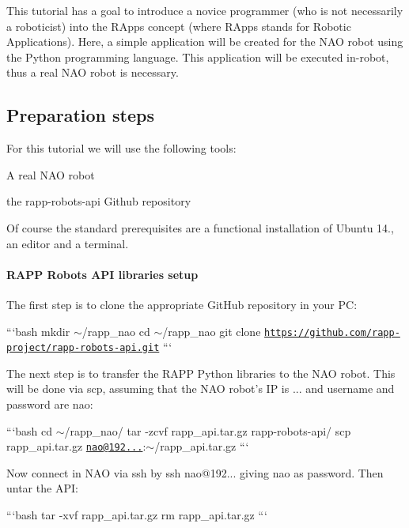 This tutorial has a goal to introduce a novice programmer (who is not necessarily a roboticist) into the R\-Apps concept (where R\-Apps stands for Robotic Applications). Here, a simple application will be created for the N\-A\-O robot using the Python programming language. This application will be executed in-\/robot, thus a real N\-A\-O robot is necessary.

\subsection*{Preparation steps}

For this tutorial we will use the following tools\-:
\begin{DoxyItemize}
\item A real N\-A\-O robot
\item the {\ttfamily rapp-\/robots-\/api} Github repository
\end{DoxyItemize}

Of course the standard prerequisites are a functional installation of Ubuntu 14., an editor and a terminal.

\paragraph*{R\-A\-P\-P Robots A\-P\-I libraries setup}

The first step is to clone the appropriate Git\-Hub repository in your P\-C\-:

```bash mkdir $\sim$/rapp\-\_\-nao cd $\sim$/rapp\-\_\-nao git clone \href{https://github.com/rapp-project/rapp-robots-api.git}{\tt https\-://github.\-com/rapp-\/project/rapp-\/robots-\/api.\-git} ```

The next step is to transfer the R\-A\-P\-P Python libraries to the N\-A\-O robot. This will be done via {\ttfamily scp}, assuming that the N\-A\-O robot's I\-P is {...} and username and password are {\ttfamily nao}\-:

```bash cd $\sim$/rapp\-\_\-nao/ tar -\/zcvf rapp\-\_\-api.\-tar.\-gz rapp-\/robots-\/api/ scp rapp\-\_\-api.\-tar.\-gz \href{mailto:nao@192.168.0.101}{\tt nao@192...}\-:$\sim$/rapp\-\_\-api.tar.\-gz ```

Now connect in N\-A\-O via ssh by {\ttfamily ssh nao@192...} giving {\ttfamily nao} as password. Then untar the A\-P\-I\-:

```bash tar -\/xvf rapp\-\_\-api.\-tar.\-gz rm rapp\-\_\-api.\-tar.\-gz ```

